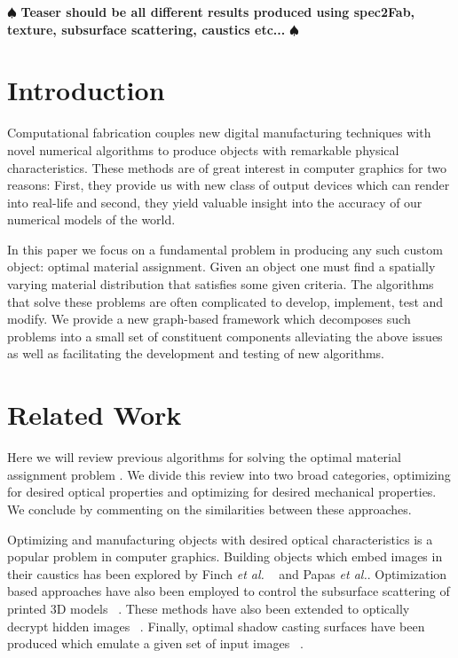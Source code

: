 \documentclass[annual]{acmsiggraph}
\newcommand{\note}[1]{\marginpar{\LARGE $\spadesuit$}
			$\spadesuit$ {\bf #1} $\spadesuit$}
\begin{document}
\keywordlist

\TOGlinkslist

\copyrightspace

\note{Teaser should be all different results produced using spec2Fab, texture, subsurface scattering, caustics etc...}


\section{Introduction}
Computational fabrication couples new digital manufacturing techniques with novel numerical algorithms to produce objects with remarkable physical characteristics. These methods are of great interest in computer graphics for two reasons: First, they provide us with  new class of output devices which can render into  real-life and second, they yield valuable insight into the accuracy of our numerical models of the world.  

In this paper we focus on a fundamental problem in producing any such custom object:  optimal material assignment. Given an object one must find a spatially varying material distribution that satisfies some given criteria. The algorithms that solve these problems are often complicated to develop, implement, test and modify. We provide a new graph-based framework which decomposes such problems into a small set of constituent components alleviating the above issues as well as facilitating the development and testing of new algorithms. 

\section{Related Work} 
Here we will review previous algorithms for solving the optimal material assignment problem . We divide this review into two broad categories, optimizing for desired optical properties and optimizing for desired mechanical properties. We conclude by commenting on the similarities between these approaches.

Optimizing and manufacturing objects with desired optical characteristics is a popular problem in computer graphics. Building objects which embed images in their caustics has been explored by Finch \textit{et al.} ~ and Papas \textit{et al.}. Optimization based approaches have also been employed to control the subsurface scattering of printed 3D models ~\cite{Hasan:2010}. These methods have also been extended to optically decrypt hidden images ~\cite{Papas:2012}. Finally, optimal shadow casting surfaces have been produced which emulate a given set of input images ~\cite{Bermano:2012}.
\end{document}
